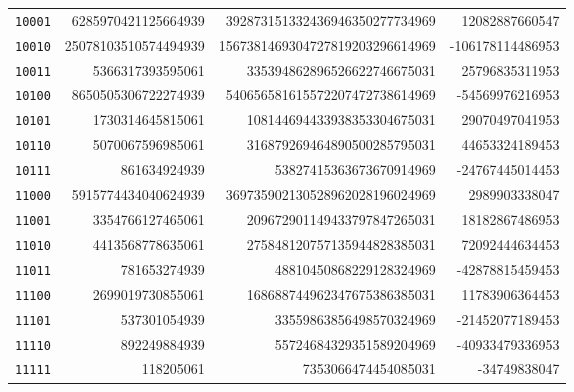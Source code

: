 \begin{longtable}{@{}c r r r@{}}
\texttt{10001} & 6285970421125664939 & 392873151332436946350277734969 & 12082887660547\\
\texttt{10010} & 25078103510574494939 & 1567381469304727819203296614969 & -106178114486953\\
\texttt{10011} & 5366317393595061 & 335394862896526622746675031 & 25796835311953\\
\texttt{10100} & 8650505306722274939 & 540656581615572207472738614969 & -54569976216953\\
\texttt{10101} & 1730314645815061 & 108144694433938353304675031 & 29070497041953\\
\texttt{10110} & 5070067596985061 & 316879269464890500285795031 & 44653324189453\\
\texttt{10111} & 861634924939 & 53827415363673670914969 & -24767445014453\\
\texttt{11000} & 5915774434040624939 & 369735902130528962028196024969 & 2989903338047\\
\texttt{11001} & 3354766127465061 & 209672901149433797847265031 & 18182867486953\\
\texttt{11010} & 4413568778635061 & 275848120757135944828385031 & 72092444634453\\
\texttt{11011} & 781653274939 & 48810450868229128324969 & -42878815459453\\
\texttt{11100} & 2699019730855061 & 168688744962347675386385031 & 11783906364453\\
\texttt{11101} & 537301054939 & 33559863856498570324969 & -21452077189453\\
\texttt{11110} & 892249884939 & 55724684329351589204969 & -40933479336953\\
\texttt{11111} & 118205061 & 7353066474454085031 & -34749838047\\
\bottomrule
\end{longtable}
